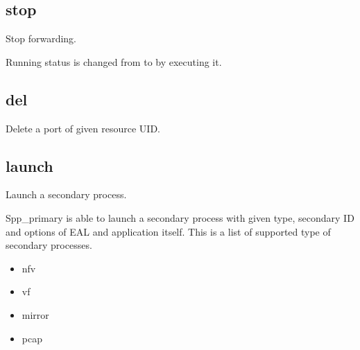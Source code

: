\documentclass[a4paper,11pt,openany,oneside,english]{sphinxmanual}
\begin{document}
\subsection{stop}
\label{\detokenize{commands/primary:stop}}\label{\detokenize{commands/primary:commands-primary-stop}}
Stop forwarding.

\begin{sphinxVerbatim}[commandchars=\\\{\},formatcom=\footnotesize]
\end{sphinxVerbatim}

Running status is changed from  to  by
executing it.

\begin{sphinxVerbatim}[commandchars=\\\{\},formatcom=\footnotesize]
\end{sphinxVerbatim}


\subsection{del}
\label{\detokenize{commands/primary:del}}\label{\detokenize{commands/primary:commands-primary-del}}
Delete a port of given resource UID.

\begin{sphinxVerbatim}[commandchars=\\\{\},formatcom=\footnotesize]
\end{sphinxVerbatim}


\subsection{launch}
\label{\detokenize{commands/primary:launch}}\label{\detokenize{commands/primary:commands-primary-launch}}
Launch a secondary process.

Spp\_primary is able to launch a secondary process with given type, secondary
ID and options of EAL and application itself. This is a list of supported type
of secondary processes.
\begin{itemize}
\item {} 
nfv

\item {} 
vf

\item {} 
mirror

\item {} 
pcap

\end{itemize}
\end{document}
